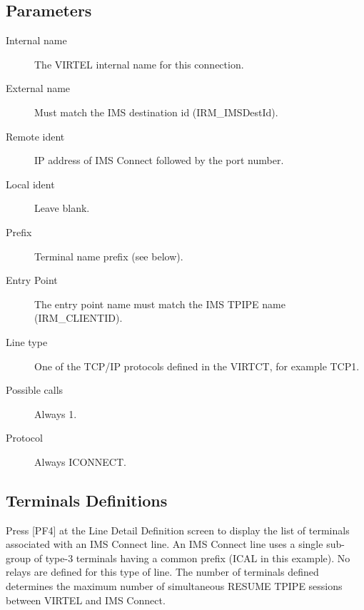 \documentclass[letterpaper,10pt,english]{sphinxmanual}
\begin{document}
\subsection{Parameters}
\label{\detokenize{connectivity_guide:id7}}\begin{description}
\item[{Internal name}] \leavevmode
The VIRTEL internal name for this connection.

\item[{External name}] \leavevmode
Must match the IMS destination id (IRM\_IMSDestId).

\item[{Remote ident}] \leavevmode
IP address of IMS Connect followed by the port number.

\item[{Local ident}] \leavevmode
Leave blank.

\item[{Prefix}] \leavevmode
Terminal name prefix (see below).

\item[{Entry Point}] \leavevmode
The entry point name must match the IMS TPIPE name (IRM\_CLIENTID).

\item[{Line type}] \leavevmode
One of the TCP/IP protocols defined in the VIRTCT, for example TCP1.

\item[{Possible calls}] \leavevmode
Always 1.

\item[{Protocol}] \leavevmode
Always ICONNECT.

\end{description}


\subsection{Terminals Definitions}
\label{\detokenize{connectivity_guide:index-23}}\label{\detokenize{connectivity_guide:terminals-definitions}}
Press {[}PF4{]} at the Line Detail Definition screen to display the list of terminals associated with an IMS Connect line. An IMS Connect line uses a single sub-group of type-3 terminals having a common prefix (ICAL in this example). No relays are defined for this type of line. The number of terminals defined determines the maximum number of simultaneous RESUME TPIPE sessions between VIRTEL and IMS Connect.
\end{document}
